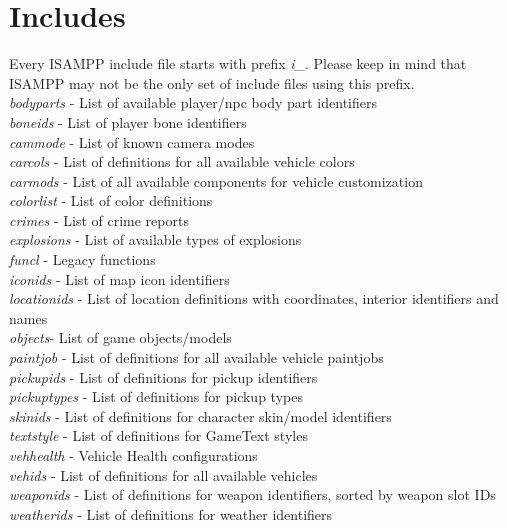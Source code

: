\documentclass{article}
\begin{document}
\section{Includes}
Every ISAMPP include file starts with prefix \textit{i\_}. Please keep in mind that ISAMPP may not be the only set of include files using this prefix.
\bigskip
\\\textit{bodyparts} - List of available player/npc body part identifiers
\\\textit{boneids} - List of player bone identifiers
\\\textit{cammode} - List of known camera modes
\\\textit{carcols} - List of definitions for all available vehicle colors
\\\textit{carmods} - List of all available components for vehicle customization
\\\textit{colorlist} - List of color definitions
\\\textit{crimes} - List of crime reports
\\\textit{explosions} - List of available types of explosions
\\\textit{funcl} - Legacy functions
\\\textit{iconids} - List of map icon identifiers
\\\textit{locationids} - List of location definitions with coordinates, interior identifiers and names
\\\textit{objects}- List of game objects/models
\\\textit{paintjob} - List of definitions for all available vehicle paintjobs
\\\textit{pickupids} - List of definitions for pickup identifiers
\\\textit{pickuptypes} - List of definitions for pickup types
\\\textit{skinids} - List of definitions for character skin/model identifiers
\\\textit{textstyle} - List of definitions for GameText styles
\\\textit{vehhealth} - Vehicle Health configurations
\\\textit{vehids} - List of definitions for all available vehicles
\\\textit{weaponids} - List of definitions for weapon identifiers, sorted by weapon slot IDs
\\\textit{weatherids} - List of definitions for weather identifiers


\newpage
\end{document}
